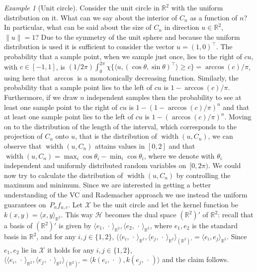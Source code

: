 \documentclass[AHL,Unicode,longabstracts,published]{cedram}
\theoremstyle{remark}
\newtheorem{examl}{Example}
\DeclareMathOperator{\diam}{width}
\newcommand{\R}{\mathbb{R}}
\newcommand{\X}{\mathcal{X}}
\newcommand{\cH}{\mathcal{H}}
\begin{document}
\begin{examl}[{Unit circle}]\label{sec:Example1}
Consider the unit circle in $\R^2$ with the uniform distribution on it. What can we say about the interior of $C_n$ as a function of $n$? In particular, what can be said about the size of $C_n$ in direction $u \in \R^2$, $\|u\|=1$? Due to the symmetry of the unit sphere and because the uniform distribution is used it is sufficient to consider the vector $u = (1, 0)^\top$. The probability that a sample point, when we sample just once, lies to the right of $c u$, with $c \in [-1,1]$, is $(1/2\pi) \int_0^{2\pi} \chi\{ \langle u, (\cos \theta, \sin \theta)^\top \rangle \geq c\} = \arccos(c)/\pi$, using here that $\arccos$ is a monotonically decreasing function. Similarly, the probability that a sample point lies to the left of $c u$ is $1-\arccos(c)/\pi$. Furthermore, if we draw $n$ independent samples then the probability to see at least one sample point to the right of $c u$ is $1 - (1-\arccos(c)/\pi)^n$ and that at least one sample point lies to the left of $c u$ is $1 - (\arccos(c)/\pi)^n$. Moving on to the distribution of the length of the interval, which corresponds to the projection of $C_n$ onto $u$, that is the distribution of $\diam(u,C_n)$, we can observe that $\diam(u,C_n)$ attains values in $[0,2]$ and that $\diam(u,C_n) = \max_i \cos \theta_i - \min_i \cos \theta_i$, where we denote with $\theta_i$ independent and uniformly distributed random variables on~$[0,2\pi)$. We could now try to calculate the distribution of $\diam(u,C_n)$ by controlling the maximum and minimum. Since we are interested in getting a better understanding of the VC and Rademacher approach we use instead the uniform guarantees on~$P_n f_{u,c}$. Let $\X$ be the unit circle and let the kernel function be $k(x,y) = \langle x, y \rangle_{\R^2}$. This way $\cH$ becomes the dual space $(\R^2)'$ of $\R^2$: recall that a basis of $(\R^2)'$ is given by $\langle e_1, \,\cdot\,\rangle_{\R^2}, \langle e_2,\,\cdot\, \rangle_{\R^2}$, where $e_1,e_2$ is the standard basis in $\R^2$, and for any $i,j\in\{1,2\}$, $\langle \langle e_i, \,\cdot\, \rangle_{\R^2}, \langle e_j, \,\cdot\, \rangle_{\R^2} \rangle_{(\R^2)'} = \langle e_i,e_j \rangle_{\R^2}$. Since $e_1,e_2$ lie in $\X$ it holds for any $i,j \in \{1,2\}$, $\langle \langle e_i, \,\cdot\, \rangle_{\R^2}, \langle e_j, \,\cdot\, \rangle_{\R^2} \rangle_{(\R^2)'} = \langle k(e_i,\,\cdot\,), k(e_j,\,\cdot\,) \rangle$ and the claim follows.



\end{examl}
\end{document}
